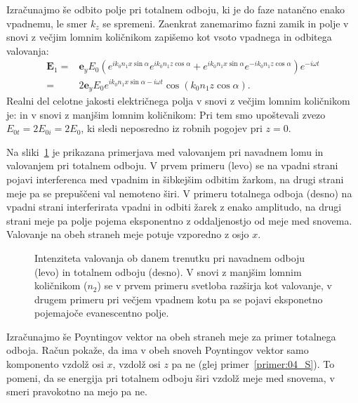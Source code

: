 Izračunajmo še odbito polje pri totalnem odboju, ki je  do faze natančno 
enako vpadnemu, le smer $k_z$ se spremeni. Zaenkrat zanemarimo fazni zamik
in polje v snovi z večjim lomnim količnikom zapišemo kot vsoto vpadnega
in odbitega valovanja:
\begin{align}
\mathbf{E}_1 =& \mathbf{e}_{y} E_{0} \left(
e^{ik_0n_1x\sin \alpha}e^{ik_0n_1z\cos \alpha}+
e^{ik_0n_1x\sin \alpha}e^{-ik_0n_1z\cos \alpha }\right) e^{-i \omega t} \nonumber\\
=& 2\mathbf{e}_{y} E_{0} e^{ik_0n_1x\sin \alpha -i\omega t} 
\cos \left(k_0 n_1z\cos \alpha \right).
 \label{eq:04_65}
\end{align}
Realni del celotne jakosti električnega polja v snovi z večjim lomnim 
količnikom je:
in v snovi z manjšim lomnim količnikom:
Pri tem smo upoštevali zvezo $E_{0t} = 2E_{0i} = 2E_0$, ki sledi neposredno iz 
robnih pogojev pri $z=0$.

Na sliki~\ref{fig:04_simulacija} je prikazana primerjava med valovanjem
pri navadnem lomu in valovanjem pri totalnem odboju. V prvem primeru (levo) se
na vpadni strani pojavi interferenca med
vpadnim in šibkejšim odbitim žarkom, na drugi strani meje pa se prepuščeni val nemoteno
širi. V primeru totalnega odboja (desno) na vpadni strani interferirata 
vpadni in odbiti žarek z enako amplitudo, na drugi strani meje pa polje pojema 
eksponentno z oddaljenostjo od meje med snovema. Valovanje na obeh straneh meje
potuje vzporedno z osjo $x$. 
\begin{figure}[ht]
\centering
\def\svgwidth{140truemm} 

\caption{Intenziteta valovanja ob 
danem trenutku pri navadnem odboju (levo) in totalnem odboju (desno).
V snovi z manjšim lomnim količnikom ($n_2$) se v prvem primeru svetloba razširja
kot valovanje, v drugem primeru pri večjem vpadnem kotu pa se pojavi eksponetno pojemajoče evanescentno
polje.}
\label{fig:04_simulacija}
\end{figure}

Izračunajmo še Poyntingov vektor na obeh straneh meje za primer totalnega odboja. 
Račun pokaže, da ima v obeh snoveh Poyntingov vektor samo komponento vzdolž osi $x$,
vzdolž osi $z$ pa ne (glej primer~\ref{primer:04_S}). To pomeni, da se energija pri totalnem odboju širi 
vzdolž meje med snovema, v smeri pravokotno na mejo pa ne.  

